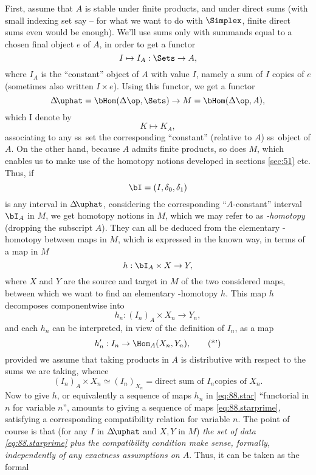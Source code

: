 First, assume that $A$ is stable under finite products, and under
direct sums (with small indexing set say -- for what we want to do
with $\Simplex$, finite direct sums even would be enough). We'll use
sums only with summands equal to a chosen final object $e$
of $A$, in order to get a functor
\[ I\mapsto I_A : \Sets\to A,\]
where $I_A$ is the ``constant'' object of $A$ with value $I$, namely a
sum of $I$ copies of $e$ (sometimes also written $I\times e$). Using
this functor, we get a functor
\[\Delta\!\uphat = \bHom(\Delta\op,\Sets) \to M =
\bHom(\Delta\op,A),\]
which I denote by
\[K\mapsto K_A,\]
associating to any ss~set the corresponding ``constant'' (relative to
$A$) ss~object of $A$. On the other hand, because $A$ admits
finite products, so does $M$, which enables us to make use of the
homotopy notions developed in sections \ref{sec:51} etc. Thus, if
\[\bI=(I,\delta_0,\delta_1)\]
is any interval in $\Delta\!\uphat$, considering the corresponding
``$A$-constant'' interval $\bI_A$ in $M$, we get homotopy notions in
$M$, which we may refer to as \emph{\bI-homotopy} (dropping the
subscript $A$). They can all be deduced from the elementary
\bI-homotopy between maps in $M$, which is expressed in the known way,
in terms of a map in $M$
\[ h : \bI_A \times X\to Y,\]
where $X$ and $Y$ are the source and target in $M$ of the two
considered maps, between which we want to find an elementary
\bI-homotopy $h$. This map $h$ decomposes componentwise into
\begin{equation}
  \label{eq:88.star}
  h_n : (I_n)_A \times X_n\to Y_n,\tag{*}
\end{equation}
and each $h_n$ can be interpreted, in view of the definition of $I_n$,
as a map
\begin{equation}
  \label{eq:88.starprime}
  h_n': I_n \to \Hom_A(X_n,Y_n),\tag{*'}
\end{equation}
provided we assume that taking products in $A$ is distributive with
respect to the sums we are taking, whence
\[ (I_n)_A \times X_n \simeq (I_n)_{X_n} = \text{direct sum of $I_n$
  copies of $X_n$.}\]
Now to give $h$, or equivalently a sequence of maps $h_n$ in
\eqref{eq:88.star} ``functorial in $n$ for variable $n$'', amounts to
giving a sequence of maps \eqref{eq:88.starprime}, satisfying a
corresponding compatibility relation for variable $n$. The point of
course is that (for any $I$ in $\Delta\!\uphat$ and $X,Y$ in $M$)
\emph{the set of data \eqref{eq:88.starprime} plus the compatibility
  condition make sense, formally, independently of any exactness
  assumptions on $A$}. Thus, it can be taken as the formal
